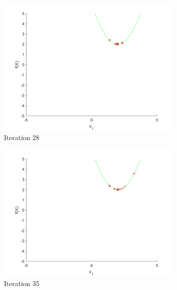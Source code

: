 \begin{figure}
\begin{subfigure}[b]{0.4\textwidth}
   \includegraphics[width=\textwidth]{img/smpl/circshft/loa-iter-28}
   \caption{Iteration 28}
   \label{fig:s8-iter-4}
 \end{subfigure}
 \begin{subfigure}[b]{0.4\textwidth}
   \includegraphics[width=\textwidth]{img/smpl/circshft/loa-iter-35}
   \caption{Iteration 35}
   \label{fig:s8-iter-5}
 \end{subfigure}
 \begin{subfigure}[b]{0.4\textwidth}

\end{subfigure}
\end{figure}
